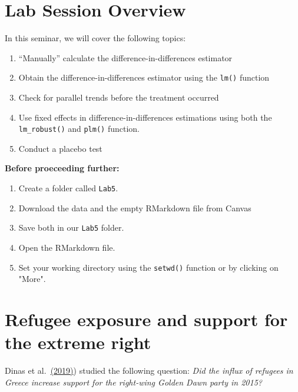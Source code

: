 \documentclass[
]{article}
\begin{document}
\section{Lab Session Overview}\label{lab-session-overview}

In this seminar, we will cover the following topics:

\begin{enumerate}
\def\labelenumi{\arabic{enumi}.}
\item
  ``Manually'' calculate the difference-in-differences estimator
\item
  Obtain the difference-in-differences estimator using the \texttt{lm()}
  function
\item
  Check for parallel trends before the treatment occurred
\item
  Use fixed effects in difference-in-differences estimations using both
  the \texttt{lm\_robust()} and \texttt{plm()} function.
\item
  Conduct a placebo test
\end{enumerate}

\textbf{Before proeceeding further:}

\begin{enumerate}
\def\labelenumi{\arabic{enumi}.}
\item
  Create a folder called \texttt{Lab5}.
\item
  Download the data and the empty RMarkdown file from Canvas
\item
  Save both in our \texttt{Lab5} folder.
\item
  Open the RMarkdown file.
\item
  Set your working directory using the \texttt{setwd()} function or by
  clicking on "More".
\end{enumerate}

\section{Refugee exposure and support for the extreme
right}\label{refugee-exposure-and-support-for-the-extreme-right}

Dinas et
al.~\href{https://www.cambridge.org/core/journals/political-analysis/article/waking-up-the-golden-dawn-does-exposure-to-the-refugee-crisis-increase-support-for-extremeright-parties/C50A127CC517968F2D0FA42A2A23FF85}{(2019)})
studied the following question: \emph{Did the influx of refugees in
Greece increase support for the right-wing Golden Dawn party in 2015?}
\end{document}

